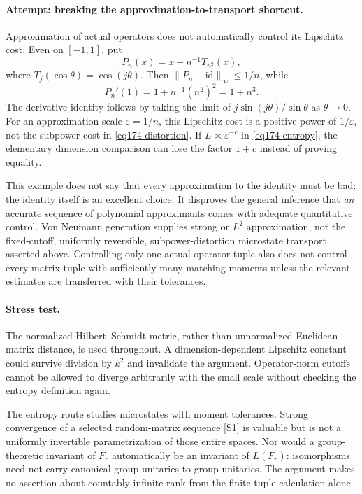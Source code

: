 \documentclass[11pt,a4paper]{article}
\newcommand{\eps}{\varepsilon}
\newcommand{\sref}[2]{\hyperlink{source:#1:#2}{[S#2]}}
\numberwithin{equation}{section}
\begin{document}
\paragraph{Attempt: breaking the approximation-to-transport shortcut.}
Approximation of actual operators does not automatically control its
Lipschitz cost. Even on $[-1,1]$, put
\[
 P_n(x)=x+n^{-1}T_{n^2}(x),
\]
where $T_j(\cos\theta)=\cos(j\theta)$. Then
$\|P_n-\mathrm{id}\|_\infty\le1/n$, while
\[
 P_n'(1)=1+n^{-1}(n^2)^2=1+n^3.
\]
The derivative identity follows by taking the limit of
$j\sin(j\theta)/\sin\theta$ as $\theta\to0$.
For an approximation scale $\eps=1/n$, this Lipschitz cost is a positive
power of $1/\eps$, not the subpower cost in \eqref{eq174-distortion}.
If $L\asymp\eps^{-c}$ in \eqref{eq174-entropy}, the elementary dimension
comparison can lose the factor $1+c$ instead of proving equality.

This example does not say that every approximation to the identity must be
bad: the identity itself is an excellent choice. It disproves the general
inference that \emph{an} accurate sequence of polynomial approximants comes
with adequate quantitative control. Von Neumann generation supplies strong
or $L^2$ approximation, not the fixed-cutoff, uniformly reversible,
subpower-distortion microstate transport asserted above. Controlling only
one actual operator tuple also does not control every matrix tuple with
sufficiently many matching moments unless the relevant estimates are
transferred with their tolerances.

\paragraph{Stress test.}
The normalized Hilbert--Schmidt metric, rather than unnormalized Euclidean
matrix distance, is used throughout. A dimension-dependent Lipschitz
constant could survive division by $k^2$ and invalidate the argument.
Operator-norm cutoffs cannot be allowed to diverge arbitrarily with the
small scale without checking the entropy definition again.

The entropy route studies microstates with moment tolerances. Strong
convergence of a selected random-matrix sequence \sref{30001752}{1} is valuable
but is not a uniformly invertible parametrization of those entire spaces.
Nor would a group-theoretic invariant of $F_r$ automatically be an invariant
of $L(F_r)$: isomorphisms need not carry canonical group unitaries to group
unitaries. The argument makes no assertion about countably infinite rank
from the finite-tuple calculation alone.
\end{document}
